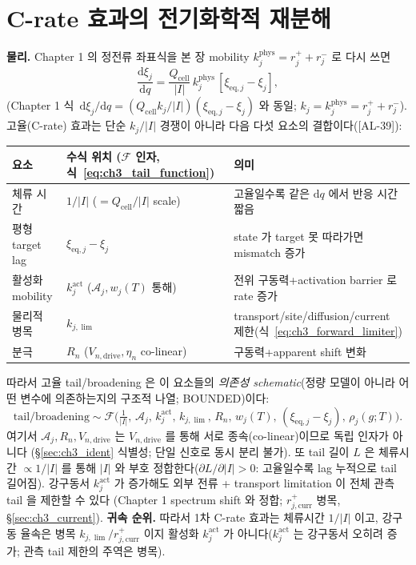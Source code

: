\documentclass[11pt,a4paper]{article}
\newcommand{\dd}{\mathrm{d}}
\newcommand{\eq}{\mathrm{eq}}
\newcommand{\drive}{\mathrm{drive}}
\newcommand{\cell}{\mathrm{cell}}
\newcommand{\curr}{\mathrm{curr}}
\newcommand{\AL}[1]{\textsf{[AL-#1]}}
\begin{document}
\section{C-rate 효과의 전기화학적 재분해}\label{sec:ch3_crate}
\textbf{물리.} Chapter 1 의 정전류 좌표식을 본 장 mobility $k_j^{\mathrm{phys}}=r_j^++r_j^-$ 로 다시 쓰면
\begin{equation}
\frac{\dd\xi_j}{\dd q}=\frac{Q_\cell}{|I|}\,k_j^{\mathrm{phys}}\,[\xi_{\eq,j}-\xi_j],
\label{eq:ch3_crate}
\end{equation}
(Chapter 1 식~$\dd\xi_j/\dd q=(Q_\cell k_j/|I|)(\xi_{\eq,j}-\xi_j)$ 와 동일; $k_j=k_j^{\mathrm{phys}}=r_j^++r_j^-$).
고율(C-rate) 효과는 단순 $k_j/|I|$ 경쟁이 아니라 다음 다섯 요소의 결합이다(\AL{39}):
\begin{longtable}{p{} >{\raggedright\arraybackslash}p{} >{\raggedright\arraybackslash}p{}}
\toprule 요소 & 수식 위치 ($\mathcal F$ 인자, 식~\eqref{eq:ch3_tail_function}) & 의미 \\ \midrule \endhead
체류 시간 & $1/|I|$ ($=Q_\cell/|I|$ scale) & 고율일수록 같은 $\dd q$ 에서 반응 시간 짧음 \\
평형 target lag & $\xi_{\eq,j}-\xi_j$ & state 가 target 못 따라가면 mismatch 증가 \\
활성화 mobility & $k_j^{\mathrm{act}}$ ($\mathcal A_j,w_j(T)$ 통해) & 전위 구동력+activation barrier 로 rate 증가 \\
물리적 병목 & $k_{j,\lim}$ & transport/site/diffusion/current 제한(식~\eqref{eq:ch3_forward_limiter}) \\
분극 & $R_n$ ($V_{n,\drive},\eta_n$ co-linear) & 구동력+apparent shift 변화 \\
\bottomrule
\end{longtable}
따라서 고율 tail/broadening 은 이 요소들의 \emph{의존성 schematic}(정량 모델이 아니라 어떤 변수에 의존하는지의
구조적 나열; BOUNDED)이다:
\begin{equation}
\mathrm{tail/broadening}\sim\mathcal F\!\Big(\tfrac{1}{|I|},\,\mathcal A_j,\,k_j^{\mathrm{act}},\,k_{j,\lim},\,R_n,\,
w_j(T),\,(\xi_{\eq,j}-\xi_j),\,\rho_j(g;T)\Big).
\label{eq:ch3_tail_function}
\end{equation}
여기서 $\mathcal A_j,R_n,V_{n,\drive}$ 는 $V_{n,\drive}$ 를 통해 서로 종속(co-linear)이므로 독립 인자가 아니다
(\S\ref{sec:ch3_ident} 식별성; 단일 신호로 동시 분리 불가). 또 tail 길이 $L$ 은 체류시간 $\propto1/|I|$ 를 통해
$|I|$ 와 부호 정합한다($\partial L/\partial|I|>0$: 고율일수록 lag 누적으로 tail 길어짐).
강구동서 $k_j^{\mathrm{act}}$ 가 증가해도 외부 전류 + transport limitation 이 전체 관측 tail 을 제한할 수 있다
(Chapter 1 spectrum shift 와 정합; $r_{j,\curr}^+$ 병목, \S\ref{sec:ch3_current}). \textbf{귀속 순위.} 따라서
1차 C-rate 효과는 체류시간 $1/|I|$ 이고, 강구동 율속은 병목 $k_{j,\lim}/r_{j,\curr}^+$ 이지 활성화 $k_j^{\mathrm{act}}$
가 아니다($k_j^{\mathrm{act}}$ 는 강구동서 오히려 증가; 관측 tail 제한의 주역은 병목).
\end{document}

